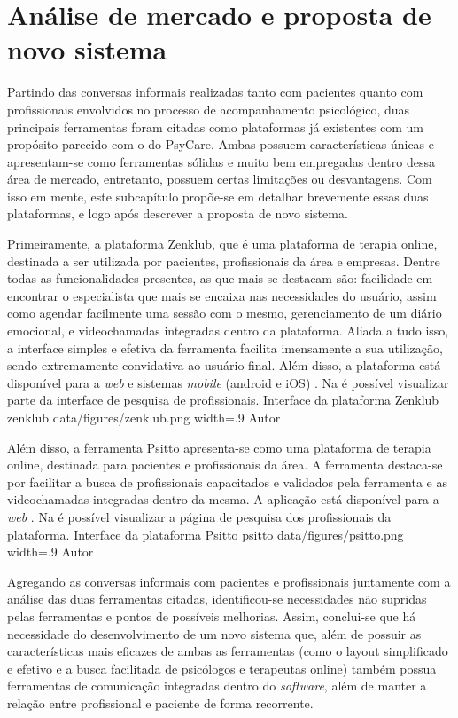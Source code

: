 \section{Análise de mercado e proposta de novo sistema}
\label{sec:analise}

Partindo das conversas informais realizadas tanto com pacientes quanto com profissionais envolvidos no processo de acompanhamento psicológico, duas principais ferramentas foram citadas como plataformas já existentes com um propósito parecido com o do PsyCare. Ambas possuem características únicas e apresentam-se como ferramentas sólidas e muito bem empregadas dentro dessa área de mercado, entretanto, possuem certas limitações ou desvantagens. Com isso em mente, este subcapítulo propõe-se em detalhar brevemente essas duas plataformas, e logo após descrever a proposta de novo sistema.

Primeiramente, a plataforma Zenklub, que é uma plataforma de terapia online, destinada a ser utilizada por pacientes, profissionais da área e empresas. Dentre todas as funcionalidades presentes, as que mais se destacam são: facilidade em encontrar o especialista que mais se encaixa nas necessidades do usuário, assim como agendar facilmente uma sessão com o mesmo, gerenciamento de um diário emocional, e videochamadas integradas dentro da plataforma. Aliada a tudo isso, a interface simples e efetiva da ferramenta facilita imensamente a sua utilização, sendo extremamente convidativa ao usuário final. Além disso, a plataforma está disponível para a \textit{web} e sistemas \textit{mobile} (android e iOS) \cite{Zenklub2023}. Na  é possível visualizar parte da interface de pesquisa de profissionais.
\image
    {Interface da plataforma Zenklub}
    {zenklub}
    {data/figures/zenklub.png}
    {width=.9\textwidth}
    {Autor}

Além disso, a ferramenta Psitto apresenta-se como uma plataforma de terapia online, destinada para pacientes e profissionais da área. A ferramenta destaca-se por facilitar a busca de profissionais capacitados e validados pela ferramenta e as videochamadas integradas dentro da mesma. A aplicação está disponível para a \textit{web} \cite{Psitto2023}. Na  é possível visualizar a página de pesquisa dos profissionais da plataforma.
\image
    {Interface da plataforma Psitto}
    {psitto}
    {data/figures/psitto.png}
    {width=.9\textwidth}
    {Autor}

Agregando as conversas informais com pacientes e profissionais juntamente com a análise das duas ferramentas citadas, identificou-se necessidades não supridas pelas ferramentas e pontos de possíveis melhorias. Assim, conclui-se que há necessidade do desenvolvimento de um novo sistema que, além de possuir as características mais eficazes de ambas as ferramentas (como o layout simplificado e efetivo e a busca facilitada de psicólogos e terapeutas online) também possua ferramentas de comunicação integradas dentro do \textit{software}, além de manter a relação entre profissional e paciente de forma recorrente. 
